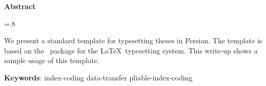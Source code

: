 


\pagestyle{empty}

\begin{latin}

\begin{center}
\textbf{Abstract}
\end{center}
\baselineskip=.8\baselineskip

We present a standard template for typesetting theses in Persian. 
The template is based on the \XePersian\ package for the \LaTeX\ typesetting system.
This write-up shows a sample usage of this template.


\bigskip\noindent\textbf{Keywords}:
index-coding data-transfer pliable-index-coding

\end{latin}
